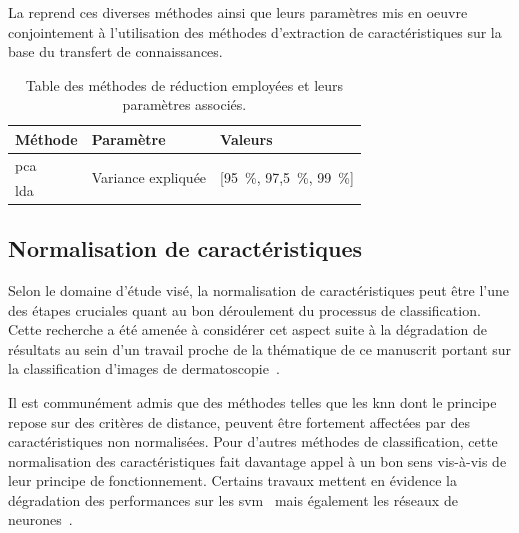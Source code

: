 La  reprend ces diverses méthodes ainsi que leurs paramètres mis en oeuvre conjointement à l'utilisation des méthodes d'extraction de caractéristiques sur la base du transfert de connaissances.\par 

\begin{table}[H]
    \centering
    \begin{tabular}{lll}
        \toprule
        \textbf{Méthode}       & \textbf{Paramètre}                 & \textbf{Valeurs}                      \\ \midrule
        \gls{pca}              & \multirow{2}{*}{Variance expliquée}& \multirow{2}{*}{[95~\%, 97,5~\%, 99~\%]} \\ \cline{1-1}
        \gls{lda}              &                                    &                                       \\ 
        \bottomrule
    \end{tabular}
    \caption{Table des méthodes de réduction employées et leurs paramètres associés.}
    \label{tab:summary_reduction_methods}
\end{table}\par

\subsection{Normalisation de caractéristiques}
\label{subsec:features_normalisation}
Selon le domaine d'étude visé, la normalisation de caractéristiques peut être l'une des étapes cruciales quant au bon déroulement du processus de classification. Cette recherche a été amenée à considérer cet aspect suite à la dégradation de résultats au sein d'un travail proche de la thématique de ce manuscrit portant sur la classification d'images de dermatoscopie~\cite{Celebi2007}.\par

Il est communément admis que des méthodes telles que les \gls{knn} dont le principe repose sur des critères de distance, peuvent être fortement affectées par des caractéristiques non normalisées. Pour d'autres méthodes de classification, cette normalisation des caractéristiques fait davantage appel à un bon sens vis-à-vis de leur principe de fonctionnement. Certains travaux mettent en évidence la dégradation des performances sur les \gls{svm}~\cite{Juszczak2002} mais également les réseaux de neurones~\cite{Celebi2007}.\par

